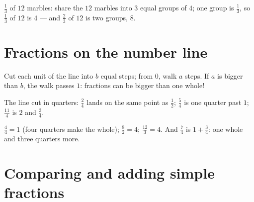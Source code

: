 \begin{example}\label{ex:g4:fractions:collection}
$\frac13$ of $12$ marbles: share the $12$ marbles into $3$ equal
groups of $4$; one group is $\frac13$, so $\frac13$ of $12$ is $4$
--- and $\frac23$ of $12$ is two groups, $8$.
\end{example}

\section{Fractions on the number line}

\begin{method}\label{met:g4:fractions:line}
Cut each unit of the line into $b$ equal steps; from $0$, walk $a$
steps. If $a$ is bigger than $b$, the walk passes $1$: fractions can
be bigger than one whole!
\end{method}

\begin{omfigure}

{\small The line cut in quarters: $\frac24$ lands on the same point
as $\frac12$; $\frac54$ is one quarter past $1$; $\frac{11}{4}$ is
$2$ and $\frac34$.}
\end{omfigure}

\begin{example}\label{ex:g4:fractions:whole}
$\frac44 = 1$ (four quarters make the whole); $\frac82 = 4$;
$\frac{12}{3} = 4$. And $\frac74$ is $1 + \frac34$: one whole and
three quarters more.
\end{example}

\section{Comparing and adding simple fractions}

